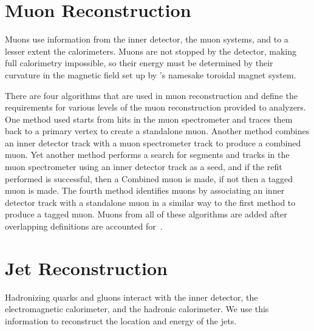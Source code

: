 \section{Muon Reconstruction}
\label{SECTION-OBJ-MU}

Muons use information from the inner detector, the muon systems, and to a lesser extent the calorimeters. Muons are not stopped by the detector, making full calorimetry impossible, so their energy must be determined by their curvature in the magnetic field set up by \atlas 's namesake toroidal magnet system. 

There are four algorithms that are used in muon reconstruction and define the requirements for various levels of the muon reconstruction provided to analyzers. One method used starts from hits in the muon spectrometer and traces them back to a primary vertex to create a standalone muon. Another method combines an inner detector track with a muon spectrometer track to produce a combined muon. Yet another method performs a search for segments and tracks in the muon spectrometer using an inner detector track as a seed, and if the refit performed is successful, then a Combined muon is made, if not then a tagged muon is made. The fourth method identifies muons by associating an inner detector track with a standalone muon in a similar way to the first  method to produce a tagged muon. Muons from all of these algorithms are added after overlapping definitions are accounted for~\cite{Muons,Aad:2016jkr}. 



\section{Jet Reconstruction}
\label{SECTION-OBJ-JET}

Hadronizing quarks and gluons interact with the inner detector, the electromagnetic calorimeter, and the hadronic calorimeter. We use this information to reconstruct the location and energy of the jets. 

